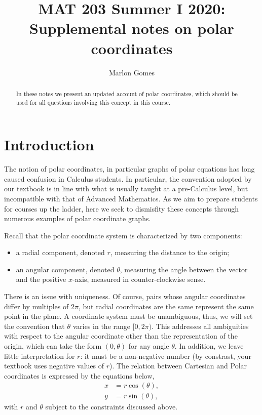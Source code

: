 \documentclass[11pt]{amsart}
\title{MAT 203 Summer I 2020: Supplemental notes on polar coordinates}
\author[M. Gomes]{Marlon Gomes}
\numberwithin{equation}{section}
\begin{document}
\begin{abstract}
In these notes we present an updated account of polar coordinates, which should be used for all questions involving this concept in this course. 
\end{abstract}

\maketitle

\section{Introduction}
The notion of polar coordinates, in particular graphs of polar equations has long caused confusion in Calculus students. In particular, the convention adopted by our textbook is in line with what is usually taught at a pre-Calculus level, but incompatible with that of Advanced Mathematics. As we aim to prepare students for courses up the ladder, here we seek to dismisfity these concepts through numerous examples of polar coordinate graphs. 

Recall that the polar coordinate system is characterized by two components:
\begin{itemize}
\item a radial component, denoted $r$, measuring the distance to the origin;
\item an angular component, denoted $\theta$, measuring the angle between the vector and the positive $x$-axis, measured in counter-clockwise sense.
\end{itemize}

There is an issue with uniqueness. Of course, pairs whose angular coordinates differ by multiples of $2\pi$, but radial coordinates are the same represent the same point in the plane. A coordinate system must be unambiguous, thus, we will set the convention that $\theta$ varies in the range $[0,2\pi)$. This addresses all ambiguities with respect to the angular coordinate other than the representation of the origin, which can take the form $(0,\theta)$ for any angle $\theta$. In addition, we leave little interpretation for $r$: it must be a non-negative number (by constrast, your textbook uses negative values of $r$). The relation between Cartesian and Polar coordinates is expressed by the equations below, 
\begin{align*}
x & = r\cos(\theta), \\
y & = r\sin(\theta),
\end{align*}
with $r$ and $\theta$ subject to the constraints discussed above. 
\end{document}
